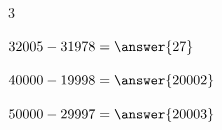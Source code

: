 \documentclass{ximera}
\begin{document}
\begin{oefening}{\oefU\ESS}
\begin{multicols}{3}
\begin{question} \(32005-31978=\answer{27}\) \end{question}

\begin{question} \(40000-19998=\answer{20002}\) \end{question}

\begin{question} \(50000-29997=\answer{20003}\) \end{question}

\end{multicols}

\end{oefening}


\end{document}
